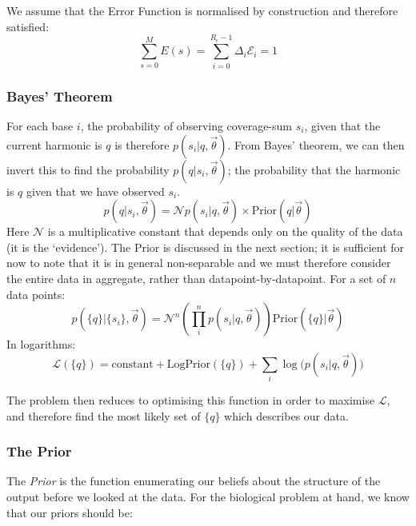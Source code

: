 \documentclass[fleqn,usenatbib]{mnras}
\begin{document}
{{						We assume that the Error Function is normalised by construction and therefore satisfied:
						\begin{equation}
							\sum_{s=0}^M E(s) = \sum_{i=0}^{R_\epsilon-1} \Delta_i \mathcal{E}_i = 1
						\end{equation}

						
					\subsubsection{Bayes' Theorem}

						For each base $i$, the probability of observing coverage-sum $s_i$, given that the current harmonic is $q$ is therefore $p(s_i | q, \vec{\theta})$. From Bayes' theorem, we can then invert this to find the probability $p(q | s_i, \vec{\theta})$; the probability that the harmonic is $q$ given that we have observed $s_i$.
						\begin{equation}
							p(q|s_i, \vec{\theta}) = \mathcal{N} {p(s_i | q, \vec{\theta}) \times \text{Prior}(q | \vec{\theta})}
						\end{equation}
						Here $\mathcal{N}$ is a multiplicative constant that depends only on the quality of the data (it is the `evidence'). The Prior is discussed in the next section; it is sufficient for now to note that it is in general non-separable and we must therefore consider the entire data in aggregate, rather than datapoint-by-datapoint. For a set of $n$ data points:
						\begin{equation}
							p( \{q\} | \{s_i\} , \vec{\theta}) = \mathcal{N}^n\left(\prod_i^n p(s_i | q, \vec{\theta}) \right) \text{Prior}(\{q\}| \vec{\theta})
						\end{equation}
						In logarithms:
						\begin{equation}
							\mathcal{L}(\{q\}) = \text{constant} + \text{LogPrior}(\{q\}) + \sum_i \log\big( p(s_i| q, \vec{\theta})\big) 
						\end{equation}

						The problem then reduces to optimising this function in order to maximise $\mathcal{L}$, and therefore find the most likely set of $\{q\}$ which describes our data.
						
					\subsubsection{The Prior}


						The \textit{Prior} is the function enumerating our beliefs about the structure of the output before we looked at the data. For the biological problem at hand, we know that our priors should be:

}}
\end{document}
